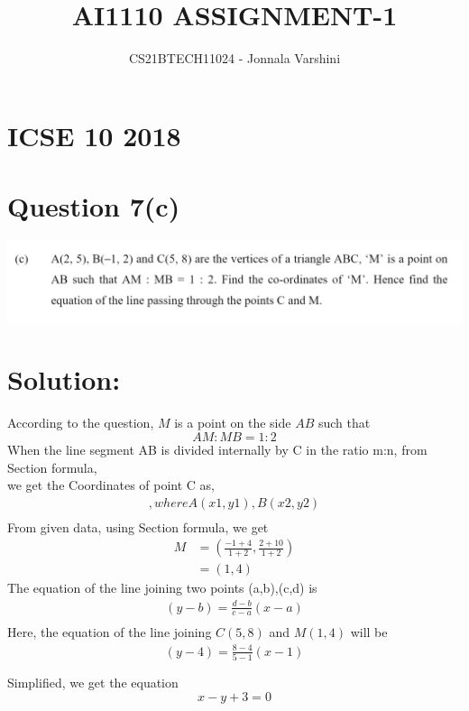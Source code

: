 \documentclass[journal,12pt,twocolumn]{IEEEtran}
\title{AI1110 ASSIGNMENT-1}
\author{CS21BTECH11024 - Jonnala Varshini}
\begin{document}
\maketitle
\section*{ICSE 10 2018}
\section*{Question 7(c)}
\begin{center}
    \includegraphics[scale=0.20]{prv1a.png}
\end{center}
\section*{Solution:}
According to the question, $M$ is a point on the side $AB$ such that $$AM : MB = 1 : 2$$
 When the line segment AB is divided internally by C in the ratio m:n, from Section formula,\\
 we get the Coordinates of point C as,\\
\begin{align*}
     [\frac{mx2+nx1}{m+n}, \frac{my2+ny1}{m+n}], where A(x1,y1),B(x2,y2) \\
\end{align*}
From given data, using Section formula, we get
\begin{align*}
    M &= (\frac{-1+4}{1+2},\frac{2+10}{1+2})\\ 
    &= (1,4)
\end{align*}
The equation of the line joining two points (a,b),(c,d) is \\
\begin{align*}
    (y-b) = {\frac{d-b}{c-a}}(x-a)\\
\end{align*}
Here, the equation of the line joining $C(5,8)$ and $M(1,4)$ will be\\
\begin{align*}
    (y-4) = \frac{8-4}{5-1}(x-1) \\\\
\end{align*}
Simplified, we get the equation $$x-y+3=0$$
\end{document}
